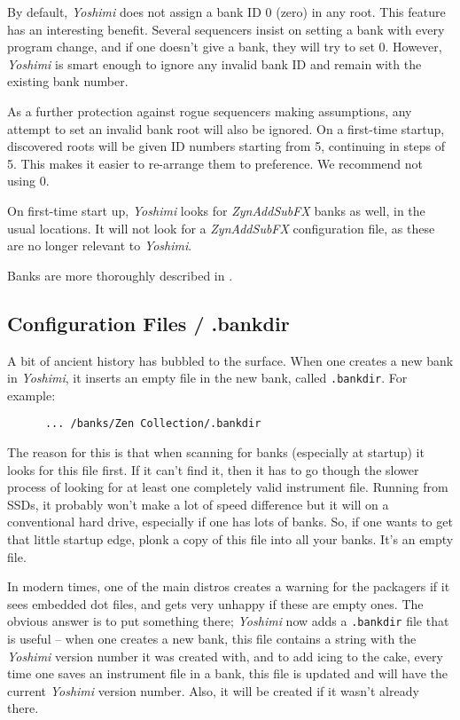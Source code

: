    By default, \textsl{Yoshimi} does not assign a bank ID 0 (zero) in any root.
   This feature has an interesting benefit. Several sequencers insist on
   setting a bank with every program change, and if one doesn't give a bank,
   they will try to set 0. However, \textsl{Yoshimi} is smart enough to ignore
   any invalid bank ID and remain with the existing bank number.

   As a further protection against rogue sequencers making assumptions, any
   attempt to set an invalid bank root will also be ignored.  On a
   first-time startup, discovered roots will be given ID numbers starting from 5,
   continuing in steps of 5. This makes it easier to re-arrange them to
   preference. We recommend not using 0.

   On first-time start up, \textsl{Yoshimi}
   looks for \textsl{ZynAddSubFX} banks as well, in the usual locations.
   It will not look for a \textsl{ZynAddSubFX} configuration file, as these
   are no longer relevant to \textsl{Yoshimi}.

   Banks are more thoroughly described in
   .

\subsection{Configuration Files / .bankdir}
\label{subsec:configuration_bankdir}

   A bit of ancient history has bubbled to the surface.
   When one creates a new bank in \textsl{Yoshimi}, it inserts an empty file in
   the new bank, called \texttt{.bankdir}.  For example:

   \begin{verbatim}
      ... /banks/Zen Collection/.bankdir
   \end{verbatim}

   The reason for this is that when scanning for banks (especially at startup) it
   looks for this file first. If it can't find it, then it has to go though the
   slower process of looking for at least one completely valid instrument file.
   Running from SSDs, it probably won't make a lot of speed difference but it
   will on a conventional hard drive, especially if one has lots of banks.  So,
   if one wants to get that little startup edge, plonk a copy of this file into
      all your banks.  It's an empty file.

   In modern times, one of the main distros creates a warning for the packagers
   if it sees embedded dot files, and gets very unhappy if these are empty ones.
   The obvious answer is to put something there; \textsl{Yoshimi} now adds a
   \texttt{.bankdir} file that is useful -- when one creates a new bank, this
   file contains a string with the \textsl{Yoshimi} version number it was
   created with, and to add icing to the cake, every time one saves an
   instrument file in a bank, this file is updated and will have the current
   \textsl{Yoshimi} version number. Also, it will be created if it wasn't
   already there.

